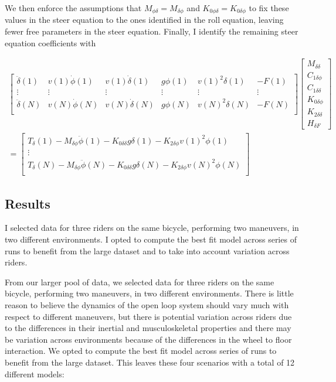\documentclass[a4paper]{article}
\begin{document}
We then enforce the assumptions that $M_{\phi\delta} = M_{\delta\phi}$ and
$K_{0\phi\delta} = K_{0\delta\phi}$ to fix these values in the steer equation
to the ones identified in the roll equation, leaving fewer free parameters in
the steer equation. Finally, I identify the remaining steer equation
coefficients with

\begin{align}
  \begin{bmatrix}
    \ddot{\delta}(1) &
    v(1) \dot{\phi}(1) &
    v(1) \dot{\delta}(1) &
    g \phi(1) &
    v(1)^2 \delta(1) &
    - F(1)\\
    \vdots & \vdots & \vdots & \vdots & \vdots & \vdots \\
    \ddot{\delta}(N) &
    v(N) \dot{\phi}(N) &
    v(N) \dot{\delta}(N) &
    g \phi(N) &
    v(N)^2 \delta(N) &
    - F(N)\\
  \end{bmatrix}
  \begin{bmatrix}
    M_{\delta\delta} \\
    C_{1\delta\phi} \\
    C_{1\delta\delta} \\
    K_{0\delta\phi} \\
    K_{2\delta\delta} \\
    H_{\delta F}
  \end{bmatrix} \nonumber \\
  =
  \begin{bmatrix}
    T_\delta(1)
    - M_{\delta\phi} \ddot{\phi}(1)
    - K_{0\delta\delta} g \delta(1)
    - K_{2\delta\phi} v(1)^2 \phi(1) \\
    \vdots\\
    T_\delta(N)
    - M_{\delta\phi} \ddot{\phi}(N)
    - K_{0\delta\delta} g \delta(N)
    - K_{2\delta\phi} v(N)^2 \phi(N) \\
  \end{bmatrix}
\end{align}

\subsection{Results}

I selected data for three riders on the same bicycle, performing two maneuvers,
in two different environments. I opted to compute the best fit model across
series of runs to benefit from the large dataset and to take into account
variation across riders.

From our larger pool of data, we selected data for three riders on the same
bicycle, performing two maneuvers, in two different environments. There is
little reason to believe the dynamics of the open loop system should vary much
with respect to different maneuvers, but there is potential variation across
riders due to the differences in their inertial and musculoskeletal properties
and there may be variation across environments because of the differences in
the wheel to floor interaction. We opted to compute the best fit model across
series of runs to benefit from the large dataset. This leaves these four
scenarios with a total of 12 different models:
\end{document}
